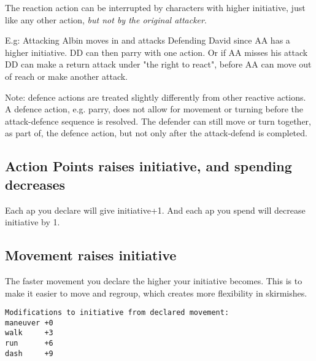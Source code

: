 The reaction action can be interrupted by characters with higher initiative, just like any other action, \emph{but not by the original attacker}.

E.g: Attacking Albin moves in and attacks Defending David since AA has a higher initiative. DD can then parry with one action. Or if AA misses his attack DD can make a return attack under "the right to react", before AA can move out of reach or make another attack.

Note: defence actions are treated slightly differently from other reactive actions. A defence action, e.g. parry, does not allow for movement or turning before the attack-defence sequence is resolved. The defender can still move or turn together, as part of, the defence action, but not only after the attack-defend is completed. %


\subsection*{Action Points raises initiative, and spending decreases}
Each ap you declare will give initiative+1. And each ap you spend will decrease initiative by 1.


\subsection*{Movement raises initiative}
The faster movement you declare the higher your initiative becomes. This is to make it easier to move and regroup, which creates more flexibility in skirmishes.

\begin{verbatim}
Modifications to initiative from declared movement:
maneuver +0
walk     +3
run      +6
dash     +9
\end{verbatim}

